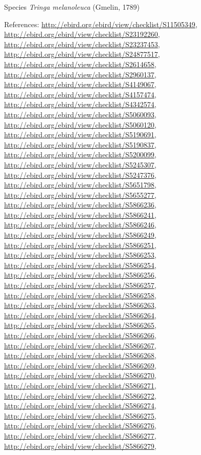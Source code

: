 \documentclass[9pt, article]{memoir}
\begin{document}
\begin{multicols}{2}
\vspace{6pt}\noindent\hspace{36pt}Species \textit{Tringa melanoleuca} (Gmelin, 1789)


\vspace{6pt}References: 
\url{http://ebird.org/ebird/view/checklist/S11505349}, 
\url{http://ebird.org/ebird/view/checklist/S23192260}, 
\url{http://ebird.org/ebird/view/checklist/S23237453}, 
\url{http://ebird.org/ebird/view/checklist/S24877517}, 
\url{http://ebird.org/ebird/view/checklist/S2614658}, 
\url{http://ebird.org/ebird/view/checklist/S2960137}, 
\url{http://ebird.org/ebird/view/checklist/S4149067}, 
\url{http://ebird.org/ebird/view/checklist/S4157474}, 
\url{http://ebird.org/ebird/view/checklist/S4342574}, 
\url{http://ebird.org/ebird/view/checklist/S5060093}, 
\url{http://ebird.org/ebird/view/checklist/S5060120}, 
\url{http://ebird.org/ebird/view/checklist/S5190691}, 
\url{http://ebird.org/ebird/view/checklist/S5190837}, 
\url{http://ebird.org/ebird/view/checklist/S5200099}, 
\url{http://ebird.org/ebird/view/checklist/S5245307}, 
\url{http://ebird.org/ebird/view/checklist/S5247376}, 
\url{http://ebird.org/ebird/view/checklist/S5651798}, 
\url{http://ebird.org/ebird/view/checklist/S5655277}, 
\url{http://ebird.org/ebird/view/checklist/S5866236}, 
\url{http://ebird.org/ebird/view/checklist/S5866241}, 
\url{http://ebird.org/ebird/view/checklist/S5866246}, 
\url{http://ebird.org/ebird/view/checklist/S5866249}, 
\url{http://ebird.org/ebird/view/checklist/S5866251}, 
\url{http://ebird.org/ebird/view/checklist/S5866253}, 
\url{http://ebird.org/ebird/view/checklist/S5866254}, 
\url{http://ebird.org/ebird/view/checklist/S5866256}, 
\url{http://ebird.org/ebird/view/checklist/S5866257}, 
\url{http://ebird.org/ebird/view/checklist/S5866258}, 
\url{http://ebird.org/ebird/view/checklist/S5866263}, 
\url{http://ebird.org/ebird/view/checklist/S5866264}, 
\url{http://ebird.org/ebird/view/checklist/S5866265}, 
\url{http://ebird.org/ebird/view/checklist/S5866266}, 
\url{http://ebird.org/ebird/view/checklist/S5866267}, 
\url{http://ebird.org/ebird/view/checklist/S5866268}, 
\url{http://ebird.org/ebird/view/checklist/S5866269}, 
\url{http://ebird.org/ebird/view/checklist/S5866270}, 
\url{http://ebird.org/ebird/view/checklist/S5866271}, 
\url{http://ebird.org/ebird/view/checklist/S5866272}, 
\url{http://ebird.org/ebird/view/checklist/S5866274}, 
\url{http://ebird.org/ebird/view/checklist/S5866275}, 
\url{http://ebird.org/ebird/view/checklist/S5866276}, 
\url{http://ebird.org/ebird/view/checklist/S5866277}, 
\url{http://ebird.org/ebird/view/checklist/S5866279}, 

\end{multicols}
\end{document}
